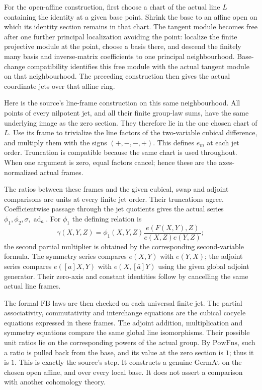For the open-affine construction, first choose a chart
of the actual line \(L\) containing the identity at a
given base point.
Shrink the base to an affine open on which its identity
section remains in that chart.
The tangent module becomes free after one further
principal localization avoiding the point:
localize the finite projective module at the point,
choose a basis there, and descend the finitely many
basis and inverse-matrix coefficients to one principal
neighbourhood.
Base-change compatibility identifies this free module
with the actual tangent module on that neighbourhood.
The preceding construction then gives the actual
coordinate jets over that affine ring.

Here is the source's line-frame construction on this
same neighbourhood.
All points of every nilpotent jet, and all their finite
group-law sums, have the same underlying image as the
zero section.
They therefore lie in the one chosen chart of \(L\).
Use its frame to trivialize the line factors of the
two-variable cubical difference, and multiply them
with the signs \((+,-,-,+)\).
This defines \(e_m\) at each jet order.
Truncation is compatible because the same chart is
used throughout.
When one argument is zero, equal factors cancel;
hence these are the axes-normalized actual frames.

The ratios between these frames and the given cubical,
swap and adjoint comparisons are units at every finite
jet order.  Their truncations agree.
Coefficientwise passage through the jet quotients gives
the actual series \(\phi_1,\phi_2,\sigma,\operatorname{ad}_a\).
For \(\phi_1\) the defining relation is
\[
 \gamma(X,Y,Z)=\phi_1(X,Y,Z)
            \frac{e(F(X,Y),Z)}{e(X,Z)e(Y,Z)};
\]
the second partial multiplier is obtained by the
corresponding second-variable formula.
The symmetry series compares \(e(X,Y)\) with \(e(Y,X)\);
the adjoint series compares \(e([a]X,Y)\) with
\(e(X,[\bar a]Y)\) using the given global adjoint generator.
Their zero-axis and constant identities follow by
cancelling the same actual line frames.

The formal \(\mathrm{FB}\) laws are then checked on
each universal finite jet.
The partial associativity, commutativity and interchange
equations are the cubical cocycle equations expressed
in these frames.
The adjoint addition, multiplication and symmetry
equations compare the same global line isomorphisms.
Their possible unit ratios lie on the corresponding
powers of the actual group.
By \(\mathrm{PowFns}\), such a ratio is pulled back
from the base, and its value at the zero section is
\(1\); thus it is \(1\).
This is exactly the source's  step.
It constructs a genuine \(\mathrm{GermAt}\) on the
chosen open affine, and over every local base.
It does not assert a comparison with another cohomology theory.

